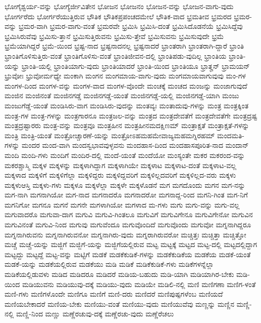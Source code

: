 {ಭೋಗೈಶ್ವರ್ಯ-ವನ್ನು
ಭೋಗ್ಯೆರ್ಜೀವಿತೇನ
ಭೋಜನ
ಭೋಜನಂ
ಭೋಜನ-ವನ್ನು
ಭೋಜನ-ವಾಗು-ವುದು
ಭೋರ್ಗರೆದು
ಭೋರ್ಗರೆಯುತ್ತಿರುವ
ಭೌತಿಕ
ಭೌತಿಕಪ್ರಪಂಚದಮೇಲೆ
ಭೌತಿಕ-ವಾದ
ಭ್ರಮತೀವ
ಭ್ರಮರದ
ಭ್ರಮರ-ವನ್ನು
ಭ್ರಮರ-ವಾಗಿ
ಭ್ರಮರ-ವಾಗು-ವಂತೆ
ಭ್ರಮರವೇ
ಭ್ರಮಿಸಿ
ಭ್ರಮಿಸಿ-ದಂತೆ
ಭ್ರಮಿಸಿದೊಡನೆಯೆ
ಭ್ರಮಿಸಿದ್ದೆವು
ಭ್ರಮಿಸಿರುವೆವು
ಭ್ರಮಿಸು-ತ್ತಾನೆ
ಭ್ರಮಿಸುತ್ತಿರುವನು
ಭ್ರಮಿಸು-ತ್ತೇವೆ
ಭ್ರಮಿಸುವನು
ಭ್ರಮಿಸುವುದೇ
ಭ್ರಮೆ
ಭ್ರಮೆಯಾಗಿದ್ದರೆ
ಭ್ರಮೆ-ಯಿಂದ
ಭ್ರಷ್ಟ-ನಾದ
ಭ್ರಷ್ಟನಾದನಲ್ಲ
ಭ್ರಷ್ಟನಾದರೆ
ಭ್ರಾಂತರಾಗಿ
ಭ್ರಾಂತರಾಗಿ-ದ್ದಾರೆ
ಭ್ರಾಂತಿ
ಭ್ರಾಂತಿಗೊಳಿಸುತ್ತಿರು-ವಂತೆ
ಭ್ರಾಂತಿಗೊಳಿಸು-ವಂತೆ
ಭ್ರಾಂತಿಜೀವನ-ದಲ್ಲಿ
ಭ್ರಾಂತಿಪಡು-ವುದಿಲ್ಲ
ಭ್ರಾಂತಿಯ
ಭ್ರಾಂತಿ-ಯನ್ನು
ಭ್ರಾಂತಿ-ಯಲ್ಲಿ
ಭ್ರಾಂತಿಯಾಗು-ವುದು
ಭ್ರಾಂತಿಯಾದರೆ
ಭ್ರಾಂತಿ-ಯಿಂದ
ಭ್ರಾಂತಿಯೂ
ಭ್ರಾತೄನ್
ಭ್ರಾಮಯನ್
ಭ್ರುವೋಃ
ಭ್ರುವೋರ್ಮಧ್ಯೇ
ಮಂಕಾಗಿ
ಮಂಗನ
ಮಂಗಮಾಯ-ವಾಗು-ವುದು
ಮಂಗಮಾಯವಾಗುವುವು
ಮಂ-ಗಳ
ಮಂಗಳ-ದಿಂದ
ಮಂಗಳ-ವನ್ನು
ಮಂಗಳ-ವಾದ
ಮಂಗಳ-ವೊಂದೇ
ಮಂಚಕ್ಕೆ
ಮಂಚದ
ಮಂಜನ್ನು
ಮಂಜಾಗುವುದೆ
ಮಂಜಿನ
ಮಂಜಿನಂತೆ
ಮಂಜಿನಗಡ್ಡೆ
ಮಂಜಿನಗಡ್ಡೆ-ಯಂತೆ
ಮಂಜಿನಗಡ್ಡೆ-ಯಲ್ಲಿ
ಮಂಜಿನಗಡ್ಡೆ-ಯಾಗಿ
ಮಂಜು
ಮಂಜುಗೆಡ್ಡೆ-ಯಂತೆ
ಮಂಡಿಸಿರು-ವಾಗ
ಮಂಡಿಸಿರು-ವುದನ್ನು
ಮಂತವ್ಯಃ
ಮಂತಾದುವು-ಗಳನ್ನು
ಮಂತ್ರ
ಮಂತ್ರಕ್ಕಿಂತ
ಮಂತ್ರ-ಗಳ
ಮಂತ್ರ-ಗಳನ್ನು
ಮಂತ್ರಗಾರನೂ
ಮಂತ್ರಜಲ-ವನ್ನು
ಮಂತ್ರದ
ಮಂತ್ರದೇವತೆಗೆ
ಮಂತ್ರದೇವತೆಗೇ
ಮಂತ್ರದ್ರಷ್ಟ
ಮಂತ್ರದ್ರಷ್ಟಾರರು
ಮಂತ್ರ-ವನ್ನು
ಮಂತ್ರವೂ
ಮಂತ್ರಹೀನ
ಮಂತ್ರಹೀನಮದಕ್ಷಿಣಮ್
ಮಂತ್ರಾಕ್ಷತೆ
ಮಂತ್ರಾಕ್ಷತೆ-ಗಳನ್ನು
ಮಂತ್ರಿ
ಮಂತ್ರಿ-ಯಂತೆ
ಮಂತ್ರೋಚ್ಚಾರಣೆ-ಯನ್ನು
ಮಂತ್ರೋಽಹಮಹಮೇವಾಜ್ಯಮಹಮಗ್ನಿರಹಮ್
ಮಂದಮತಿ-ಗಳನ್ನು
ಮಂದರ
ಮಂದ-ವಾಗಿ
ಮಂದಸ್ವಭಾವವುಳ್ಳವನು
ಮಂದಹಾಸ-ದಿಂದ
ಮಂದಹಾಸಪೂರಿತ-ನಾದ
ಮಂದಾನ್
ಮಂದಿ
ಮಂದಿ-ಗಳು
ಮಂದಿಗೆ
ಮಂದಿರ-ದಲ್ಲಿ
ಮಂದೆ-ಯಂತೆ
ಮಂದೆಯೋ
ಮಂಸ್ಯಂತೇ
ಮಕರ
ಮಕರಂದ-ವನ್ನು
ಮಕರಶ್ಚಾಸ್ಮಿ
ಮಕ್ಕಳ
ಮಕ್ಕಳನ್ನು
ಮಕ್ಕಳಾಗಿದ್ದಾಗ
ಮಕ್ಕಳಾಗಿಯೇ
ಮಕ್ಕಳಾಟ
ಮಕ್ಕಳಾಟ-ದಂತೆ
ಮಕ್ಕಳಾಟ-ವಲ್ಲ
ಮಕ್ಕಳಾದ
ಮಕ್ಕಳಿಗೆ
ಮಕ್ಕಳಿಗೆಲ್ಲಾ
ಮಕ್ಕಳಿದ್ದರು
ಮಕ್ಕಳಿದ್ದವರಿಗೆ
ಮಕ್ಕಳಿಲ್ಲದವರಿಗೆ
ಮಕ್ಕಳಿಲ್ಲದ-ವರು
ಮಕ್ಕಳು
ಮಕ್ಕಳುಆಸ್ತಿ
ಮಕ್ಕಳು-ಗಳು
ಮಕ್ಕಳೂ
ಮಕ್ಕಳೆಲ್ಲಾ
ಮಕ್ಕಳೇ
ಮಕ್ಕಳೊಡನೆ
ಮಗ
ಮಗದೊಂದು
ಮಗನ
ಮಗ-ನನ್ನು
ಮಗ-ನಾಗಿ
ಮಗನಾಗಿಯೋ
ಮಗ-ನಾದ
ಮಗನಾದರೊ
ಮಗನಾದರೋ
ಮಗನಾದ್ದ-ರಿಂದ
ಮಗನಿ-ಗಿಂತ
ಮಗ-ನಿಗೆ
ಮಗನಿಗೋ
ಮಗನೂ
ಮಗನೆ
ಮಗನೇ
ಮಗಳಾಗಿಯೋ
ಮಗಳಾದ
ಮ-ಗಳು
ಮಗು
ಮಗು-ವನ್ನು
ಮಗು-ವಲ್ಲ
ಮಗುವಾದರೊ
ಮಗುವಾ-ದಾಗ
ಮಗುವಿ
ಮಗುವಿ-ಗಿಂತಲೂ
ಮಗುವಿಗೆ
ಮಗುವಿಗೇನೂ
ಮಗುವಿಗೇನೋ
ಮಗುವಿನ
ಮಗುವಿನಂತೆ
ಮಗುವಿ-ನಿಂದ
ಮಗುವು
ಮಗುವೆಂದೂ
ಮಗುವೊಂದಿದೆ
ಮಗುವೊಂದು
ಮಗುವೋ
ಮಗ್ನನಾಗಿದ್ದರೂ
ಮಗ್ನನಾಗಿರುವನು
ಮಗ್ನನಾಗಿರುವನೋ
ಮಗ್ನನಾಗಿರು-ವುದು
ಮಗ್ನರಾಗಿರುವರೋ
ಮಚ್ಚಿತ್ತಃ
ಮಚ್ಚಿತ್ತಾ
ಮಚ್ಚಿತ್ತೋ
ಮಚ್ಚೆ
ಮಚ್ಚೆ-ಯನ್ನು
ಮಜ್ಜಿಗೆ
ಮಜ್ಜಿಗೆ-ಯನ್ನು
ಮಜ್ಜಿಗೆಯಲ್ಲಿರುವ
ಮಟ್ಟ
ಮಟ್ಟಕ್ಕೆ
ಮಟ್ಟದ
ಮಟ್ಟ-ದಲ್ಲಿ
ಮಟ್ಟದಲ್ಲಿದ್ದಾಗ
ಮಟ್ಟದ್ದು
ಮಟ್ಟದ್ದೆ
ಮಟ್ಟ-ವನ್ನು
ಮಟ್ಟಿಗೆ
ಮಡಕೆ
ಮಡಕೆಕುಡಿಕೆ-ಗಳನ್ನು
ಮಡಕೆಕುಡಿಕೆಯ
ಮಡಕೆಯ
ಮಡಕೆ-ಯಂತೆ
ಮಡಕೆ-ಯನ್ನು
ಮಡಕೆಯಲ್ಲಿರುವ
ಮಡಕೆಯು
ಮಡಿ
ಮಡಿಕೆ
ಮಡಿಕೆಕುಡಿಕೆ-ಗಳು
ಮಡಿಕೆಗಳನ್ನೆಲ್ಲಾ
ಮಡಿಕೆಯಲ್ಲಿಡುವಳು
ಮಡಿದ
ಮಡಿದರೂ
ಮಡಿದರೆ
ಮಡಿಯ-ಬಹುದು
ಮಡಿ-ಯಾಗಿ
ಮಡಿಯಾಗಿರ-ಬೇಕು
ಮಡಿ-ಯಿಂದ
ಮಡಿಯುವನು
ಮಡಿಯುವು-ದಕ್ಕೆ
ಮಡಿಯು-ವುದು
ಮಡಿಯೇ
ಮಡಿಲಿ-ನಲ್ಲಿ
ಮಣಿ
ಮಣಿಗಣಾ
ಮಣಿಗ-ಳಂತೆ
ಮಣಿ-ಗಳು
ಮಣಿಗಳೊಂದೇ
ಮಣಿಗೂ
ಮಣಿಗೆ
ಮಣಿ-ದರು
ಮಣಿದರೆ
ಮಣಿಪುಷ್ಪಗಳೆಂಬ
ಮಣಿಯದೆ
ಮಣಿಯಬೇಕಾದರೆ
ಮಣಿಯ-ಬೇಕು
ಮಣಿಯು-ವಂತೆ
ಮಣಿಯು-ವುದು
ಮಣಿಯುವೆವು
ಮಣ್ಣನ್ನು
ಮಣ್ಣಿನ
ಮಣ್ಣಿ-ನಲ್ಲಿ
ಮಣ್ಣಿ-ನಿಂದ
ಮಣ್ಣು
ಮಣ್ಣೆರಚುವು-ದಕ್ಕೆ
ಮಣ್ಣೆರಚು-ವುದು
ಮಣ್ಣೆರೆಚಲು
}
